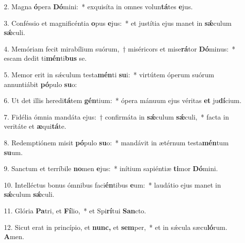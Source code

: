 \item 2. Magna \textbf{ó}pera \textbf{Dó}mini:~* exquisíta in omnes volun\textbf{tá}tes \textbf{e}jus.
\item 3. Conféssio et magnificéntia \textbf{o}pus \textbf{e}jus:~* et justítia ejus manet in \textbf{sǽ}culum \textbf{sǽ}culi.
\item 4. Memóriam fecit mirabílium suórum,~† miséricors et mise\textbf{rá}tor \textbf{Dó}minus:~* escam dedit ti\textbf{mén}ti\textbf{bus} se.
\item 5. Memor erit in sǽculum testa\textbf{mén}ti \textbf{su}i:~* virtútem óperum suórum annuntiábit \textbf{pó}pulo \textbf{su}o:
\item 6. Ut det illis heredi\textbf{tá}tem \textbf{gén}tium:~* ópera mánuum ejus véritas \textbf{et} ju\textbf{dí}cium.
\item 7. Fidélia ómnia mandáta ejus:~† confirmáta in \textbf{sǽ}culum \textbf{sǽ}culi,~* facta in veritáte et \textbf{æ}qui\textbf{tá}te.
\item 8. Redemptiónem misit \textbf{pó}pulo \textbf{su}o:~* mandávit in ætérnum testa\textbf{mén}tum \textbf{su}um.
\item 9. Sanctum et terríbile \textbf{no}men \textbf{e}jus:~* inítium sapiéntiæ \textbf{ti}mor \textbf{Dó}mini.
\item 10. Intelléctus bonus ómnibus faci\textbf{én}tibus \textbf{e}um:~* laudátio ejus manet in \textbf{sǽ}culum \textbf{sǽ}culi.
\item 11. Glória \textbf{Pa}tri, et \textbf{Fí}lio,~* et Spi\textbf{rí}tui \textbf{San}cto.
\item 12. Sicut erat in princípio, et \textbf{nunc,} et \textbf{sem}per,~* et in sǽcula sæcu\textbf{ló}rum. \textbf{A}men.
